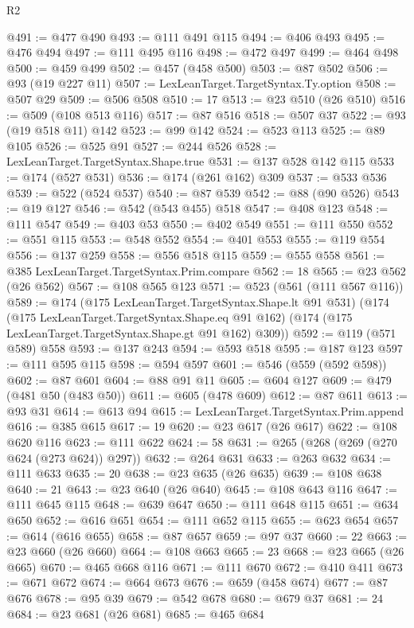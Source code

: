 \begin{lexlean}{R2}
\begin{coremodule}
@491 := @477 @490
@493 := @111 @491 @115
@494 := @406 @493
@495 := @476 @494
@497 := @111 @495 @116
@498 := @472 @497
@499 := @464 @498
@500 := @459 @499
@502 := @457 (@458 @500)
@503 := @87 @502
@506 := @93 (@19 @227 @11)
@507 := LexLeanTarget.TargetSyntax.Ty.option
@508 := @507 @29
@509 := @506 @508
@510 := 17
@513 := @23 @510 (@26 @510)
@516 := @509 (@108 @513 @116)
@517 := @87 @516
@518 := @507 @37
@522 := @93 (@19 @518 @11) @142
@523 := @99 @142
@524 := @523 @113
@525 := @89 @105
@526 := @525 @91
@527 := @244 @526
@528 := LexLeanTarget.TargetSyntax.Shape.true
@531 := @137 @528 @142 @115
@533 := @174 (@527 @531)
@536 := @174 (@261 @162) @309
@537 := @533 @536
@539 := @522 (@524 @537)
@540 := @87 @539
@542 := @88 (@90 @526)
@543 := @19 @127
@546 := @542 (@543 @455) @518
@547 := @408 @123
@548 := @111 @547
@549 := @403 @53
@550 := @402 @549
@551 := @111 @550
@552 := @551 @115
@553 := @548 @552
@554 := @401 @553
@555 := @119 @554
@556 := @137 @259
@558 := @556 @518 @115
@559 := @555 @558
@561 := @385 LexLeanTarget.TargetSyntax.Prim.compare
@562 := 18
@565 := @23 @562 (@26 @562)
@567 := @108 @565 @123
@571 := @523 (@561 (@111 @567 @116))
@589 := @174
    (@175 LexLeanTarget.TargetSyntax.Shape.lt @91 @531)
    (@174
      (@175 LexLeanTarget.TargetSyntax.Shape.eq @91 @162)
      (@174 (@175 LexLeanTarget.TargetSyntax.Shape.gt @91 @162) @309))
@592 := @119 (@571 @589) @558
@593 := @137 @243
@594 := @593 @518
@595 := @187 @123
@597 := @111 @595 @115
@598 := @594 @597
@601 := @546 (@559 (@592 @598))
@602 := @87 @601
@604 := @88 @91 @11
@605 := @604 @127
@609 := @479 (@481 @50 (@483 @50))
@611 := @605 (@478 @609)
@612 := @87 @611
@613 := @93 @31
@614 := @613 @94
@615 := LexLeanTarget.TargetSyntax.Prim.append
@616 := @385 @615
@617 := 19
@620 := @23 @617 (@26 @617)
@622 := @108 @620 @116
@623 := @111 @622
@624 := 58
@631 := @265 (@268 (@269 (@270 @624 (@273 @624)) @297))
@632 := @264 @631
@633 := @263 @632
@634 := @111 @633
@635 := 20
@638 := @23 @635 (@26 @635)
@639 := @108 @638
@640 := 21
@643 := @23 @640 (@26 @640)
@645 := @108 @643 @116
@647 := @111 @645 @115
@648 := @639 @647
@650 := @111 @648 @115
@651 := @634 @650
@652 := @616 @651
@654 := @111 @652 @115
@655 := @623 @654
@657 := @614 (@616 @655)
@658 := @87 @657
@659 := @97 @37
@660 := 22
@663 := @23 @660 (@26 @660)
@664 := @108 @663
@665 := 23
@668 := @23 @665 (@26 @665)
@670 := @465 @668 @116
@671 := @111 @670
@672 := @410 @411
@673 := @671 @672
@674 := @664 @673
@676 := @659 (@458 @674)
@677 := @87 @676
@678 := @95 @39
@679 := @542 @678
@680 := @679 @37
@681 := 24
@684 := @23 @681 (@26 @681)
@685 := @465 @684

\end{coremodule}
\end{lexlean}
